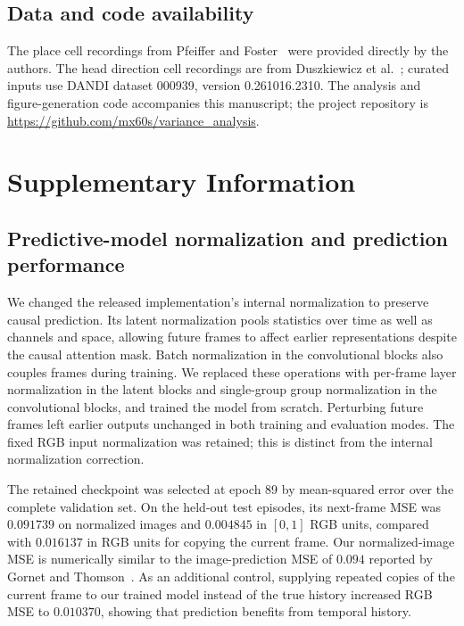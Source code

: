 \documentclass[11pt]{article}
\begin{document}
\subsection*{Data and code availability}
The place cell recordings from Pfeiffer and Foster~\cite{Pfeiffer2013} were provided directly by the authors. The head direction cell recordings are from Duszkiewicz et al.~\cite{Duszkiewicz2024}; curated inputs use DANDI dataset 000939, version 0.261016.2310. The analysis and figure-generation code accompanies this manuscript; the project repository is \url{https://github.com/mx60s/variance_analysis}.

\small{


}

\clearpage
\section*{Supplementary Information}

\setcounter{figure}{0}
\renewcommand{\thefigure}{S\arabic{figure}}

\subsection*{Predictive-model normalization and prediction performance}

We changed the released implementation's internal normalization to preserve causal prediction. Its latent normalization pools statistics over time as well as channels and space, allowing future frames to affect earlier representations despite the causal attention mask. Batch normalization in the convolutional blocks also couples frames during training. We replaced these operations with per-frame layer normalization in the latent blocks and single-group group normalization in the convolutional blocks, and trained the model from scratch. Perturbing future frames left earlier outputs unchanged in both training and evaluation modes. The fixed RGB input normalization was retained; this is distinct from the internal normalization correction.

The retained checkpoint was selected at epoch 89 by mean-squared error over the complete validation set. On the held-out test episodes, its next-frame MSE was $0.091739$ on normalized images and $0.004845$ in $[0,1]$ RGB units, compared with $0.016137$ in RGB units for copying the current frame. Our normalized-image MSE is numerically similar to the image-prediction MSE of $0.094$ reported by Gornet and Thomson~\cite{Gornet2024automated}. As an additional control, supplying repeated copies of the current frame to our trained model instead of the true history increased RGB MSE to $0.010370$, showing that prediction benefits from temporal history.
\end{document}
